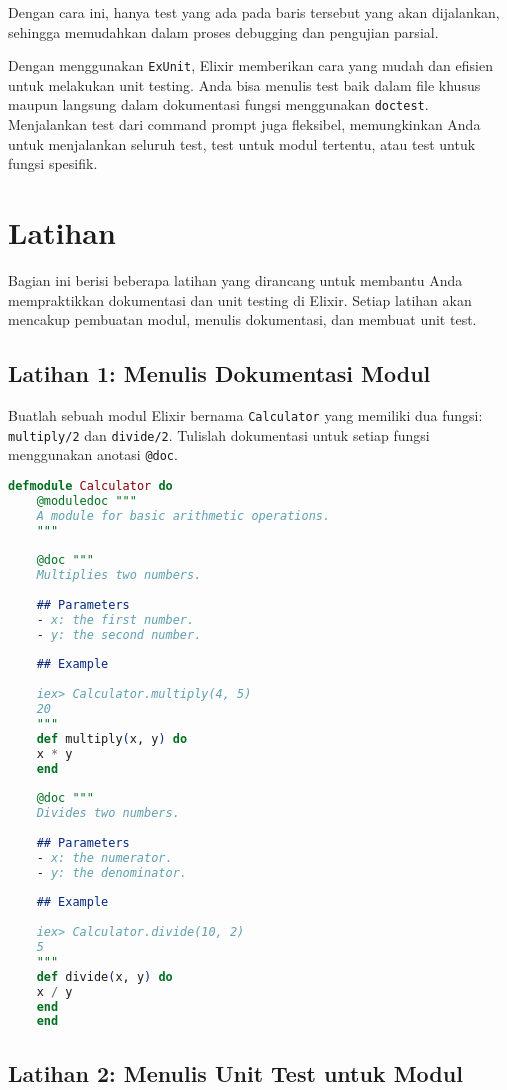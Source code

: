 Dengan cara ini, hanya test yang ada pada baris tersebut yang akan dijalankan, sehingga memudahkan dalam proses debugging dan pengujian parsial.

Dengan menggunakan \texttt{ExUnit}, Elixir memberikan cara yang mudah dan efisien untuk melakukan unit testing. Anda bisa menulis test baik dalam file khusus maupun langsung dalam dokumentasi fungsi menggunakan \texttt{doctest}. Menjalankan test dari command prompt juga fleksibel, memungkinkan Anda untuk menjalankan seluruh test, test untuk modul tertentu, atau test untuk fungsi spesifik.

\section{Latihan}

Bagian ini berisi beberapa latihan yang dirancang untuk membantu Anda mempraktikkan dokumentasi dan unit testing di Elixir. Setiap latihan akan mencakup pembuatan modul, menulis dokumentasi, dan membuat unit test. 

\subsection{Latihan 1: Menulis Dokumentasi Modul}

Buatlah sebuah modul Elixir bernama \texttt{Calculator} yang memiliki dua fungsi: \texttt{multiply/2} dan \texttt{divide/2}. Tulislah dokumentasi untuk setiap fungsi menggunakan anotasi \texttt{@doc}.

\begin{lstlisting}[language=Elixir]
	defmodule Calculator do
	@moduledoc """
	A module for basic arithmetic operations.
	"""
	
	@doc """
	Multiplies two numbers.
	
	## Parameters
	- x: the first number.
	- y: the second number.
	
	## Example
	
	iex> Calculator.multiply(4, 5)
	20
	"""
	def multiply(x, y) do
	x * y
	end
	
	@doc """
	Divides two numbers.
	
	## Parameters
	- x: the numerator.
	- y: the denominator.
	
	## Example
	
	iex> Calculator.divide(10, 2)
	5
	"""
	def divide(x, y) do
	x / y
	end
	end
\end{lstlisting}

\subsection{Latihan 2: Menulis Unit Test untuk Modul}


